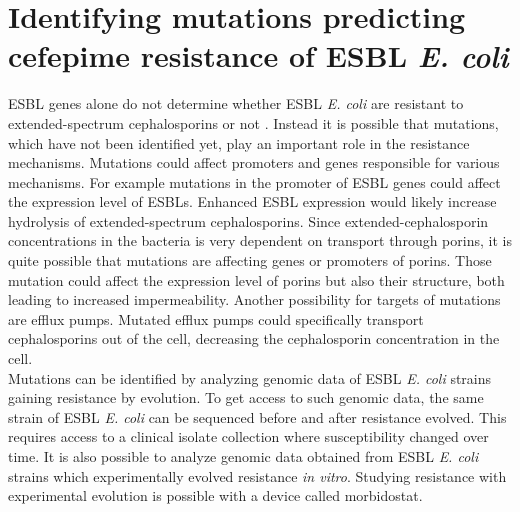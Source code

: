 \section{Identifying mutations predicting cefepime resistance of ESBL \textit{E. coli}}
ESBL genes alone do not determine whether ESBL \textit{E. coli} are resistant to extended-spectrum cephalosporins or not \cite{hombach_consequences_2013}. Instead it is possible that mutations, which have not been identified yet, play an important role in the resistance mechanisms. Mutations could affect promoters and genes responsible for various mechanisms. For example mutations in the promoter of ESBL genes could affect the expression level of ESBLs. Enhanced ESBL expression would likely increase hydrolysis of extended-spectrum cephalosporins. Since extended-cephalosporin concentrations in the bacteria is very dependent on transport through porins, it is quite possible that mutations are affecting genes or promoters of porins. Those mutation could affect the expression level of porins but also their structure, both leading to increased impermeability. Another possibility for targets of mutations are efflux pumps. Mutated efflux pumps could specifically transport cephalosporins out of the cell, decreasing the cephalosporin concentration in the cell. \\
Mutations can be identified by analyzing genomic data of  ESBL \textit{E. coli} strains gaining resistance by evolution. To get access to such genomic data, the same strain of ESBL \textit{E. coli} can be sequenced before and after resistance evolved. This requires access to a clinical isolate collection where susceptibility changed over time. It is also possible to analyze genomic data obtained from ESBL \textit{E. coli} strains which experimentally evolved resistance \textit{in vitro}. Studying resistance with experimental evolution is possible with a device called morbidostat.

